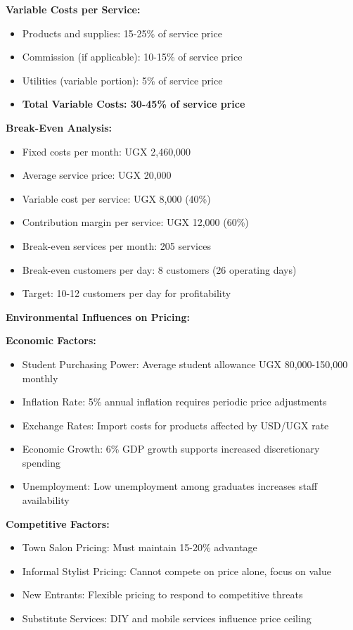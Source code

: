 \textbf{Variable Costs per Service:}
\begin{itemize}[leftmargin=2em]
    \item Products and supplies: 15-25\% of service price
    \item Commission (if applicable): 10-15\% of service price
    \item Utilities (variable portion): 5\% of service price
    \item \textbf{Total Variable Costs: 30-45\% of service price}
\end{itemize}

\textbf{Break-Even Analysis:}
\begin{itemize}[leftmargin=2em]
    \item Fixed costs per month: UGX 2,460,000
    \item Average service price: UGX 20,000
    \item Variable cost per service: UGX 8,000 (40\%)
    \item Contribution margin per service: UGX 12,000 (60\%)
    \item Break-even services per month: 205 services
    \item Break-even customers per day: 8 customers (26 operating days)
    \item Target: 10-12 customers per day for profitability
\end{itemize}

\vspace{1em}

\textbf{Environmental Influences on Pricing:}

\textbf{Economic Factors:}
\begin{itemize}[leftmargin=2em]
    \item Student Purchasing Power: Average student allowance UGX 80,000-150,000 monthly
    \item Inflation Rate: 5\% annual inflation requires periodic price adjustments
    \item Exchange Rates: Import costs for products affected by USD/UGX rate
    \item Economic Growth: 6\% GDP growth supports increased discretionary spending
    \item Unemployment: Low unemployment among graduates increases staff availability
\end{itemize}

\textbf{Competitive Factors:}
\begin{itemize}[leftmargin=2em]
    \item Town Salon Pricing: Must maintain 15-20\% advantage
    \item Informal Stylist Pricing: Cannot compete on price alone, focus on value
    \item New Entrants: Flexible pricing to respond to competitive threats
    \item Substitute Services: DIY and mobile services influence price ceiling
\end{itemize}

